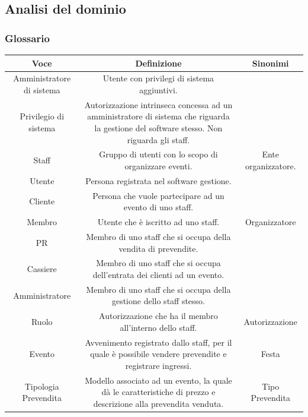 \documentclass[a4paper]{article}
\begin{document}
\newpage

\subsection{Analisi del dominio}

\subsubsection{Glossario}

\begin{table}[ht!]
  \begin{center}
    \begin{tabulary}{1\textwidth}{|c|C|C|}
        \hline
        \textbf{Voce} & \textbf{Definizione} & \textbf{Sinonimi}\\
        \hline
        \hline
		Amministratore di sistema & Utente con privilegi di sistema aggiuntivi. & \\
		\hline
		Privilegio di sistema & Autorizzazione intrinseca concessa ad un amministratore di sistema che riguarda la gestione del software stesso. Non riguarda gli staff. & \\
		\hline
        Staff & Gruppo di utenti con lo scopo di organizzare eventi. & Ente organizzatore. \\
        \hline
        Utente & Persona registrata nel software gestione. & \\
        \hline
		Cliente & Persona che vuole partecipare ad un evento di uno staff. & \\
		\hline
        Membro & Utente che è iscritto ad uno staff. & Organizzatore \\
        \hline
		PR & Membro di uno staff che si occupa della vendita di prevendite. & \\
		\hline
		Cassiere & Membro di uno staff che si occupa dell'entrata dei clienti ad un evento. & \\
		\hline
		Amministratore & Membro di uno staff che si occupa della gestione dello staff stesso. & \\
		\hline
        Ruolo & Autorizzazione che ha il membro all'interno dello staff. & Autorizzazione \\
        \hline
        Evento & Avvenimento registrato dallo staff, per il quale è possibile vendere prevendite e registrare ingressi. & Festa \\
        \hline
        Tipologia Prevendita & Modello associato ad un evento, la quale dà le caratteristiche di prezzo e descrizione alla prevendita venduta. & Tipo Prevendita \\

\end{tabulary}
\end{center}
\end{table}
\end{document}
